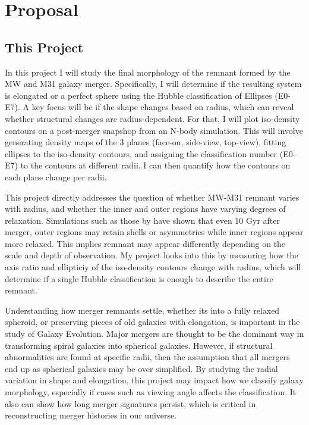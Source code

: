 \documentclass[usenatbib]{mnras}
\begin{document}
\section{Proposal}

\subsection{This Project}
In this project I will study the final morphology of the remnant formed by the MW and M31 galaxy merger. Specifically, I will determine if the resulting system is elongated or a perfect sphere using the Hubble classification of Ellipses (E0-E7). A key focus will be if the shape changes based on radius, which can reveal whether structural changes are radius-dependent. For that, I will plot iso-density contours on a post-merger snapshop from an N-body simulation. This will involve generating density maps of the 3 planes (face-on, side-view, top-view), fitting ellipses to the iso-density contours, and assigning the classification number (E0-E7) to the contours at different radii. I can then quantify how the contours on each plane change per radii. 

This project directly addresses the question of whether MW-M31 remnant varies with radius, and whether the inner and outer regions have varying degrees of relaxation. Simulations such as those by \citet[PDF p. 16]{vandermarel12b} have shown that even 10 Gyr after merger, outer regions may retain shells or asymmetries while inner regions appear more relaxed. This implies remnant may appear differently depending on the scale and depth of observation. My project looks into this by measuring how the axis ratio and ellipticiy of the iso-density contours change with radius, which will determine if a single Hubble classification is enough to describe the entire remnant. 

Understanding how merger remnants settle, whether its into a fully relaxed spheroid, or preserving pieces of old galaxies with elongation, is important in the study of Galaxy Evolution. Major mergers are thought to be the dominant way in transforming spiral galaxies into spherical galaxies. However, if structural abnormalities are found at specific radii, then the assumption that all mergers end up as spherical galaxies may be over simplified. By studying the radial variation in shape and elongation, this project may impact how we classify galaxy morphology, especially if cases such as viewing angle affects the classification. It also can show how long merger signatures persist, which is critical in reconstructing merger histories in our universe. 
\end{document}
